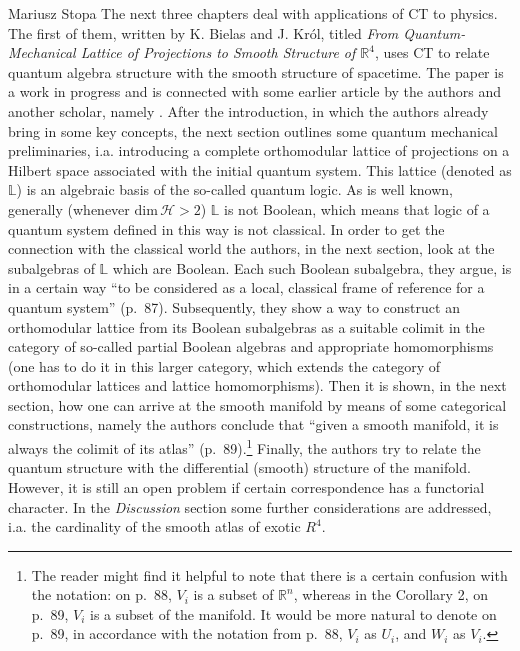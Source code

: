 \begin{recengenv}{Mariusz Stopa}
\enlargethispage{-.5\baselineskip}
The next three chapters deal with applications of CT to physics. The first of them, written by K. Bielas and J. Król, titled \textit{From Quantum-Mechanical Lattice of Projections to Smooth Structure of $ \mathbb{R}^4 $}, uses CT to relate quantum algebra structure with the smooth structure of spacetime. The paper is a work in progress and is connected with some earlier article by the authors and another scholar, namely \textcite{krol-2017}. After the introduction, in which the authors already bring in some key concepts, the next section outlines some quantum mechanical preliminaries, i.a. introducing a complete orthomodular lattice of projections on a Hilbert space associated with the initial quantum system. This lattice (denoted as $ \mathbb{L} $) is an algebraic basis of the so-called quantum logic. As is well known, generally (whenever $\text{dim}\,\mathscr{H}>2$) $ \mathbb{L} $ is not Boolean, which means that logic of a quantum system defined in this way is not classical. In order to get the connection with the classical world the authors, in the next section, look at the subalgebras of $ \mathbb{L} $ which are Boolean. Each such Boolean subalgebra, they argue, is in a certain way ``to be considered as a local, classical frame of reference for a quantum system'' (p.~87). Subsequently, they show a way to construct an orthomodular lattice from its Boolean subalgebras as a suitable colimit in the cat\-e\-go\-ry of so-called partial Boolean algebras and appropriate homomorphisms (one has to do it in this larger cat\-e\-go\-ry, which extends the cat\-e\-go\-ry of orthomodular lattices and lattice homomorphisms). Then it is shown, in the next section, how one can arrive at the smooth manifold by means of some cat\-e\-gor\-i\-cal constructions, namely the authors conclude that ``given a smooth manifold, it is always the colimit of its atlas'' (p.~89).\footnote{The reader might find it helpful to note that there is a certain confusion with the notation: on p.~88, $ V_i $ is a subset of $ \mathbb{R}^n $, whereas in the Corollary 2, on p.~89, $ V_i $ is a subset of the manifold. It would be more natural to denote on p.~89, in accordance with the notation from p.~88, $ V_i $ as $ U_i $, and $ W_i $ as $ V_i $.} Finally, the authors try to relate the quantum structure with the differential (smooth) structure of the manifold. However, it is still an open problem if certain correspondence has a functorial character. In the \textit{Discussion} section some further considerations are addressed, i.a. the cardinality of the smooth atlas of exotic $ R^4 $. 



\end{recengenv}
